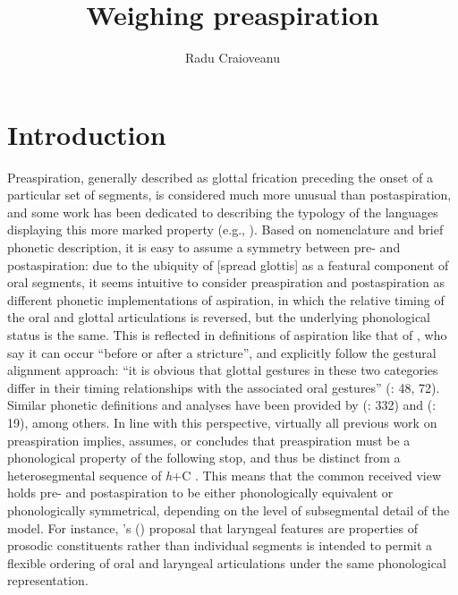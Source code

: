 \documentclass[output=paper,colorlinks,citecolor=brown]{langscibook}
\author{Radu Craioveanu\orcid{0000-0002-2181-4949}\affiliation{University of Toronto}}
\title{Weighing preaspiration}
\begin{document}
\maketitle

\section{Introduction}
\label{sec-introduction}

Preaspiration, generally described as glottal frication preceding the onset of a particular set of segments, is considered much more unusual than postaspiration, and some work has been dedicated to describing the typology of the languages displaying this more marked property (e.g., \citealt{nichasaide1985,Helgason2002,Silverman2003,Clayton:2010,chapters/16_Hejná}). Based on nomenclature and brief phonetic description, it is easy to assume a symmetry between pre- and postaspiration: due to the ubiquity of [spread glottis] as a featural component of oral segments, it seems intuitive to consider preaspiration and postaspiration as different phonetic implementations of aspiration, in which the relative timing of the oral and glottal articulations is reversed, but the underlying phonological status is the same.
This is reflected in definitions of aspiration like that of \citeauthor{LadefogedMaddieson1996}, who say it can occur ``before or after a stricture'', and explicitly follow the gestural alignment approach: ``it is obvious that glottal gestures in these two categories differ in their timing relationships with the associated oral gestures'' ({\citeyear{LadefogedMaddieson1996}: 48, 72}). Similar phonetic definitions and analyses have been provided by {\citeauthor{catford1968}} (\citeyear{catford1968}: 332) and {\citeauthor{stevens1975}} (\citeyear{stevens1975}: 19), among others. In line with this perspective, virtually all previous work on preaspiration implies, assumes, or concludes that preaspiration must be a phonological property of the following stop, and thus be distinct from a heterosegmental sequence of \textit{h}+C \citep[e.g.,][]{nichasaide1985,Helgason2002,Clayton:2010}. This means that the common received view holds pre- and postaspiration to be either phonologically equivalent or phonologically symmetrical, depending on the level of subsegmental detail of the model. For instance, {\citeauthor{kehreingolston2004}'s (\citeyear{kehreingolston2004})} proposal that laryngeal features are properties of prosodic constituents rather than individual segments is intended to permit a flexible ordering of oral and laryngeal articulations under the same phonological representation.
\end{document}

